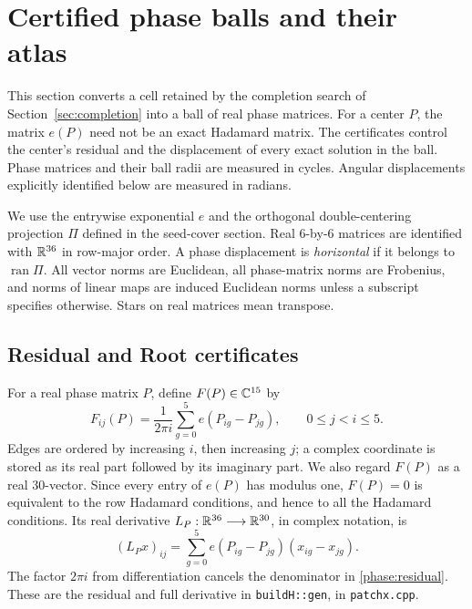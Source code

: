 \section{Certified phase balls and their atlas}
\label{sec:phase-cover}

This section converts a cell retained by the completion search of
Section~\ref{sec:completion} into a ball of real phase matrices.  For a
center \(P\), the matrix \(e(P)\) need not be an exact Hadamard matrix.
The certificates control the center's residual and the displacement of
every exact solution in the ball.  Phase matrices and their ball radii
are measured in cycles.  Angular displacements explicitly identified
below are measured in radians.

We use the entrywise exponential \(e\) and the orthogonal double-centering
projection \(\Pi\) defined in the seed-cover section.  Real \(6\)-by-\(6\)
matrices are identified with \(\mathbb R^{36}\) in row-major order.  A phase
displacement is \emph{horizontal} if it belongs to \(\operatorname{ran}\Pi\).
All vector norms are Euclidean, all phase-matrix norms are Frobenius, and
norms of linear maps are induced Euclidean norms unless a subscript
specifies otherwise.  Stars on real matrices mean transpose.

\subsection{Residual and Root certificates}
\label{sec:root-certificate}

For a real phase matrix \(P\), define \(F(P)\in\mathbb C^{15}\) by
\begin{equation}
 F_{ij}(P)=\frac{1}{2\pi i}\sum_{g=0}^{5}e(P_{ig}-P_{jg}),
 \qquad 0\leq j<i\leq5.
 \label{phase:residual}
\end{equation}
Edges are ordered by increasing \(i\), then increasing \(j\); a complex
coordinate is stored as its real part followed by its imaginary part.
We also regard \(F(P)\) as a real \(30\)-vector.  Since every entry of
\(e(P)\) has modulus one, \(F(P)=0\) is equivalent to the row Hadamard
conditions, and hence to all the Hadamard conditions.  Its real
derivative \(L_P:\mathbb R^{36}\longrightarrow\mathbb R^{30}\), in complex notation, is
\begin{equation}
 (L_Px)_{ij}=\sum_{g=0}^{5}e(P_{ig}-P_{jg})(x_{ig}-x_{jg}).
 \label{phase:derivative}
\end{equation}
The factor \(2\pi i\) from differentiation cancels the denominator in
\eqref{phase:residual}.  These are the residual and full derivative in
\texttt{buildH::gen}, in \texttt{patchx.cpp}.

